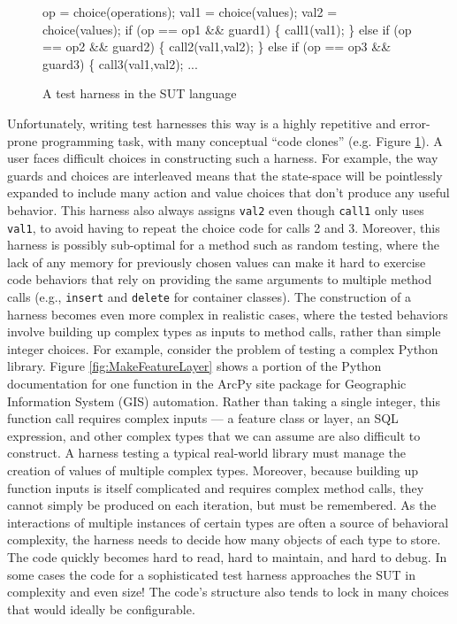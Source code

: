 \begin{figure}[b]
{\scriptsize
\begin{code}
op = choice(operations);
val1 = choice(values);
val2 = choice(values);
if (op == op1 \&\& guard1) \{
    call1(val1);
\} else if (op == op2 \&\& guard2) \{
    call2(val1,val2);
\} else if (op == op3 \&\& guard3) \{
    call3(val1,val2);
...
\end{code}
}
\vspace{-0.15in}
\caption {A test harness in the SUT language}
\label{fig:badharness}
\end{figure}

Unfortunately, writing test harnesses this way is a highly repetitive
and error-prone programming task, with many conceptual ``code clones''
(e.g. Figure \ref{fig:badharness}). A user faces difficult choices in
constructing such a harness. For example, the way guards and choices
are interleaved means that the state-space will be pointlessly
expanded to include many action and value choices that don't produce
any useful behavior.  This harness also always assigns {\tt val2} even
though {\tt call1} only uses {\tt val1}, to avoid having to repeat the
choice code for calls 2 and 3.  Moreover, this harness is possibly
sub-optimal for a method such as random testing, where the lack of any
memory for previously chosen values can make it hard to exercise code
behaviors that rely on providing the same arguments to multiple method
calls (e.g., {\tt insert} and {\tt delete} for container classes).
The construction of a harness becomes even more complex in realistic
cases, where the tested behaviors involve building up complex types as
inputs to method calls, rather than simple integer choices. For
example, consider the problem of testing a complex Python library.  Figure
\ref{fig:MakeFeatureLayer} shows a portion of the Python documentation for one function in the ArcPy site
package for Geographic Information System (GIS) automation.  Rather than taking a single integer, this
function call requires complex inputs --- a feature class or
layer, an SQL expression, and other complex types that we can assume
are also difficult to construct.  A harness testing a typical
real-world library must manage the creation of values of multiple complex types.
Moreover, because building up function inputs is itself complicated
and requires complex method calls, they cannot simply be produced on each iteration, but must be
remembered.  As the interactions of multiple instances of certain
types are often a source of behavioral complexity,
the harness needs to decide how many objects of each type to store.
The code quickly becomes hard to read, hard to maintain, and hard to
debug.  In some cases \cite{AMAI} the code for a sophisticated test
harness approaches the SUT in complexity and even size!  The code's
structure also tends to lock in many choices that would ideally be configurable.

